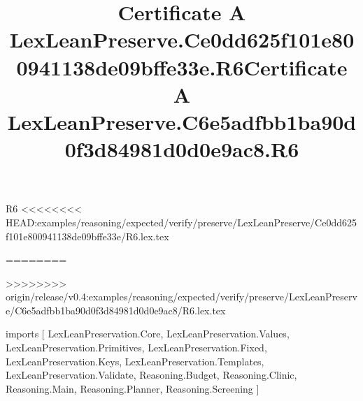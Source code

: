 \begin{lexlean}{R6}
<<<<<<<< HEAD:examples/reasoning/expected/verify/preserve/LexLeanPreserve/Ce0dd625f101e800941138de09bffe33e/R6.lex.tex
\title{Certificate A LexLeanPreserve.Ce0dd625f101e800941138de09bffe33e.R6}
========
\title{Certificate A LexLeanPreserve.C6e5adfbb1ba90d0f3d84981d0d0e9ac8.R6}
>>>>>>>> origin/release/v0.4:examples/reasoning/expected/verify/preserve/LexLeanPreserve/C6e5adfbb1ba90d0f3d84981d0d0e9ac8/R6.lex.tex
\begin{coremodule}
imports [
  LexLeanPreservation.Core,
  LexLeanPreservation.Values,
  LexLeanPreservation.Primitives,
  LexLeanPreservation.Fixed,
  LexLeanPreservation.Keys,
  LexLeanPreservation.Templates,
  LexLeanPreservation.Validate,
  Reasoning.Budget,
  Reasoning.Clinic,
  Reasoning.Main,
  Reasoning.Planner,
  Reasoning.Screening
]


\end{coremodule}
\end{lexlean}
